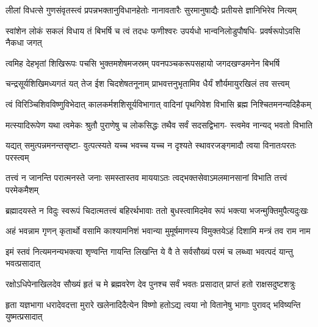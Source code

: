 \fourlineindentedshloka
{लीलां विधत्से गुणसंवृतस्त्वं}
{प्रपन्नभक्तानुविधानहेतोः}
{नानावतारैः सुरमानुषाद्यैः}
{प्रतीयसे ज्ञानिभिरेव नित्यम्} %

\fourlineindentedshloka
{स्वांशेन लोकं सकलं विधाय तं}
{बिभर्षि च त्वं तदधः फणीश्वरः}
{उपर्यधो भान्वनिलोडुपौषधि-}
{प्रवर्षरूपोऽवसि नैकधा जगत्} %

\fourlineindentedshloka
{त्वमिह देहभृतां शिखिरूपः}
{पचसि भुक्तमशेषमजस्रम्}
{पवनपञ्चकरूपसहायो}
{जगदखण्डमनेन बिभर्षि} %

\fourlineindentedshloka
{चन्द्रसूर्यशिखिमध्यगतं यत्}
{तेज ईश चिदशेषतनूनाम्}
{प्राभवत्तनुभृतामिव धैर्यं}
{शौर्यमायुरखिलं तव सत्त्वम्} %

\fourlineindentedshloka
{त्वं विरिञ्चिशिवविष्णुविभेदात्}
{कालकर्मशशिसूर्यविभागात्}
{वादिनां पृथगिवेश विभासि}
{ब्रह्म निश्चितमनन्यदिहैकम्} %

\fourlineindentedshloka
{मत्स्यादिरूपेण यथा त्वमेकः}
{श्रुतौ पुराणेषु च लोकसिद्धः}
{तथैव सर्वं सदसद्विभाग-}
{स्त्वमेव नान्यद् भवतो विभाति} %

\fourlineindentedshloka
{यद्यत् समुत्पन्नमनन्तसृष्टा-}
{वुत्पत्स्यते यच्च भवच्च यच्च}
{न दृश्यते स्थावरजङ्गमादौ}
{त्वया विनातःपरतः परस्त्वम्} %

\fourlineindentedshloka
{तत्त्वं न जानन्ति परात्मनस्ते}
{जनाः समस्तास्तव माययाऽतः}
{त्वद्भक्तसेवाऽमलमानसानां}
{विभाति तत्त्वं परमेकमैशम्} %

\fourlineindentedshloka
{ब्रह्मादयस्ते न विदुः स्वरूपं}
{चिदात्मतत्त्वं बहिरर्थभावाः}
{ततो बुधस्त्वामिदमेव रूपं}
{भक्त्या भजन्मुक्तिमुपैत्यदुःखः} %

\fourlineindentedshloka
{अहं भवन्नाम गृणन् कृतार्थो}
{वसामि काश्यामनिशं भवान्या}
{मुमूर्षमाणस्य विमुक्तयेऽहं}
{दिशामि मन्त्रं तव राम नाम} %

\fourlineindentedshloka
{इमं स्तवं नित्यमनन्यभक्त्या}
{शृण्वन्ति गायन्ति लिखन्ति ये वै}
{ते सर्वसौख्यं परमं च लब्ध्वा}
{भवत्पदं यान्तु भवत्प्रसादात्} %

\begin{minipage}{\linewidth}
\centering
{}

\fourlineindentedshloka
{रक्षोऽधिपेनाखिलदेव सौख्यं}
{हृतं च मे ब्रह्मवरेण देव}
{पुनश्च सर्वं भवतः प्रसादात्}
{प्राप्तं हतो राक्षसदुष्टशत्रुः} %
\end{minipage}

\begin{minipage}{\linewidth}
\centering
{}

\fourlineindentedshloka
{हृता यज्ञभागा धरादेवदत्ता}
{मुरारे खलेनादिदैत्येन विष्णो}
{हतोऽद्य त्वया नो वितानेषु भागाः}
{पुरावद् भविष्यन्ति युष्मत्प्रसादात्} %
\end{minipage}

